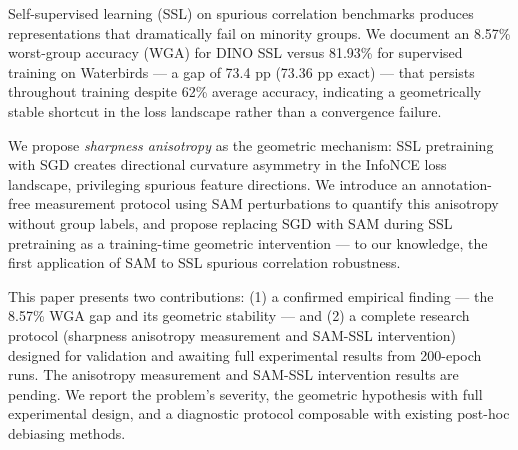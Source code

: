 Self-supervised learning (SSL) on spurious correlation benchmarks produces representations that dramatically fail on minority groups. We document an 8.57\% worst-group accuracy (WGA) for DINO SSL versus 81.93\% for supervised training on Waterbirds --- a gap of 73.4 pp (73.36 pp exact) --- that persists throughout training despite 62\% average accuracy, indicating a geometrically stable shortcut in the loss landscape rather than a convergence failure.

We propose \textit{sharpness anisotropy} as the geometric mechanism: SSL pretraining with SGD creates directional curvature asymmetry in the InfoNCE loss landscape, privileging spurious feature directions. We introduce an annotation-free measurement protocol using SAM perturbations to quantify this anisotropy without group labels, and propose replacing SGD with SAM during SSL pretraining as a training-time geometric intervention --- to our knowledge, the first application of SAM to SSL spurious correlation robustness.

This paper presents two contributions: (1) a confirmed empirical finding --- the 8.57\% WGA gap and its geometric stability --- and (2) a complete research protocol (sharpness anisotropy measurement and SAM-SSL intervention) designed for validation and awaiting full experimental results from 200-epoch runs. The anisotropy measurement and SAM-SSL intervention results are pending. We report the problem's severity, the geometric hypothesis with full experimental design, and a diagnostic protocol composable with existing post-hoc debiasing methods.
